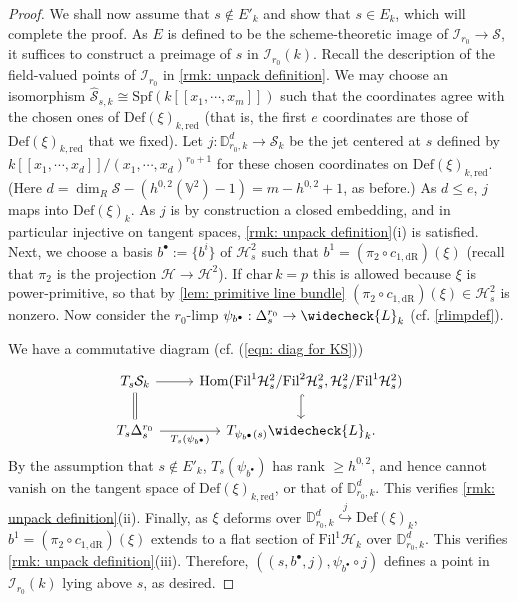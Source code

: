 \documentclass[letter, 11pt]{article}
\theoremstyle{plain}
\theoremstyle{definition}
\newcommand{\ID}{\mathbb{D}}
\newcommand{\Hom}{\mathrm{Hom}}
\newcommand{\che}[1]{\widecheck{#1}}
\newcommand{\<}{\langle}
\renewcommand{\>}{\rangle}
\newcommand{\into}{\hookrightarrow}
\newcommand{\sI}{\mathcal{I}}
\newcommand{\sH}{\mathcal{H}}
\newcommand{\sS}{\mathcal{S}}
\newcommand{\Fil}{\mathrm{Fil}}
\newcommand{\Spf}{\mathrm{Spf}}
\newcommand{\Def}{\mathrm{Def}}
\newcommand{\dR}{\mathrm{dR}}
\newcommand{\red}{\mathrm{red}}
\newcommand{\mpr}{}
\begin{document}
\begin{proof}
We shall now assume that $s \not\in E'_k$ and show that $s \in E_k$, which will complete the proof. As $E$ is defined to be the scheme-theoretic image of $\sI_{r_0} \to \sS$, it suffices to construct a preimage of $s$ in $\sI_{r_0}(k)$. Recall the description of the field-valued points of $\sI_{r_0}$ in \ref{rmk: unpack definition}. We may choose an isomorphism $\hat{\sS}_{s,k} \cong \Spf(k[\![x_1, \cdots, x_{m}]\!])$ such that the coordinates agree with the chosen ones of $\Def(\xi)_{k,\red}$ \mpr{(that is, the first $e$ coordinates are those of $\Def(\xi)_{k,\red}$ that we fixed)}. Let $j : \ID^d_{r_0, k} \to \sS_k$ be the jet centered at $s$ defined by $k[\![x_1, \cdots, x_d]\!]/(x_1, \cdots, x_d)^{r_0 + 1}$ for these chosen coordinates on $\Def(\xi)_{k,\red}$. \mpr{(Here $d = \dim_{R} \mathcal{S} - (h^{0,2}(\mathbb{V}^2) - 1) = m - h^{0, 2} + 1$, as before.)} \mpr{As $d \le e$, $j$ maps into $\Def(\xi)_k$. As $j$ is by construction a closed embedding, and in particular injective on tangent spaces, \ref{rmk: unpack definition}(i) is satisfied.} Next, we choose a basis $b^\bullet := \{ b^i \}$ of $\sH^2_{s}$ such that $b^1 = (\pi_2 \circ c_{1, \dR})(\xi)$ (recall that $\pi_2$ is the projection $\sH \to \sH^2$). If $\textrm{char}\, k = p$ this is allowed because $\xi$ is power-primitive, so that by \ref{lem: primitive line bundle} $(\pi_2 \circ c_{1, \dR})(\xi) \in \sH^2_s$ is nonzero. Now consider the $r_0$-limp $\psi_{b^\bullet} : \Delta^{r_0}_s \to \che{L}_k$ (cf. \ref{rlimpdef}). 

We have a commutative diagram (cf. (\ref{eqn: diag for KS}))
\[\begin{tikzcd}
	{T_s \sS_k} & { \Hom(\Fil^1 \sH^2_s / \Fil^2 \sH^2_s, \sH^2_s / \Fil^1 \sH^2_s) } \\
	{T_s \Delta^{r_0}_s} & {T_{\psi_{b^\bullet}(s)}\che{L}_k}
	\arrow[from=1-1, to=1-2]
	\arrow[equal, from=1-1, to=2-1]
	\arrow["{T_s(\psi_{b^\bullet})}"', from=2-1, to=2-2]
	\arrow[hook, from=1-2, to=2-2].
\end{tikzcd}\]
By the assumption that $s \not\in E'_k$, ${T_s(\psi_{b^\bullet})}$ has rank $\ge h^{0, 2}$, and hence cannot vanish on the tangent space of $\Def(\xi)_{k,\red}$, or that of $\ID^d_{r_0, k}$. This verifies \ref{rmk: unpack definition}(ii). Finally, as $\xi$ deforms over $\ID^d_{r_0, k} \stackrel{j}{\into} \Def(\xi)_k$, $b^1 = (\pi_2 \circ c_{1, \dR})(\xi)$ extends to a flat section of $\Fil^1 \sH_{k}$ over $\ID^d_{r_0, k}$. This verifies \ref{rmk: unpack definition}(iii). Therefore, $((s, b^\bullet, j), \psi_{b^\bullet} \circ j)$ defines a point in $\sI_{r_0}(k)$ lying above $s$, as desired. 
\end{proof}
\end{document}
